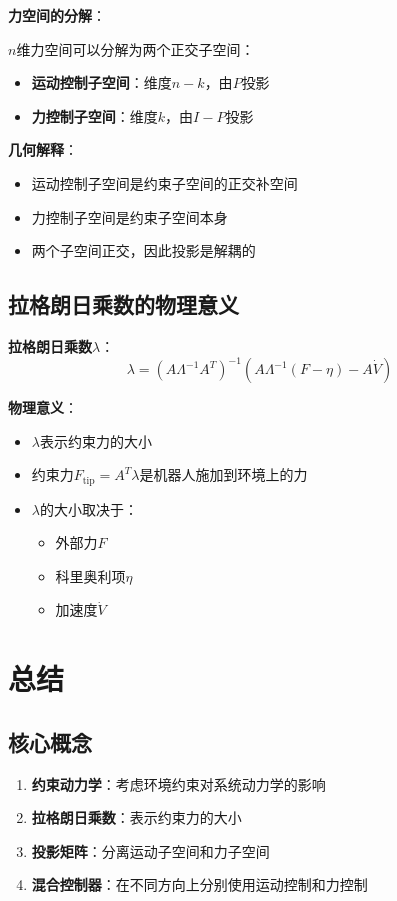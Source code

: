 \documentclass[12pt,a4paper]{article}
\begin{document}
\textbf{力空间的分解}：

$n$维力空间可以分解为两个正交子空间：
\begin{itemize}
\item \textbf{运动控制子空间}：维度$n-k$，由$P$投影
\item \textbf{力控制子空间}：维度$k$，由$I-P$投影
\end{itemize}

\textbf{几何解释}：
\begin{itemize}
\item 运动控制子空间是约束子空间的正交补空间
\item 力控制子空间是约束子空间本身
\item 两个子空间正交，因此投影是解耦的
\end{itemize}

\subsection{拉格朗日乘数的物理意义}

\textbf{拉格朗日乘数$\lambda$}：
\begin{equation}
\lambda = (A\Lambda^{-1}A^T)^{-1}(A\Lambda^{-1}(F - \eta) - A\dot{V})
\end{equation}

\textbf{物理意义}：
\begin{itemize}
\item $\lambda$表示约束力的大小
\item 约束力$F_{\text{tip}} = A^T\lambda$是机器人施加到环境上的力
\item $\lambda$的大小取决于：
\begin{itemize}
\item 外部力$F$
\item 科里奥利项$\eta$
\item 加速度$\dot{V}$
\end{itemize}
\end{itemize}

\section{总结}

\subsection{核心概念}

\begin{enumerate}
\item \textbf{约束动力学}：考虑环境约束对系统动力学的影响
\item \textbf{拉格朗日乘数}：表示约束力的大小
\item \textbf{投影矩阵}：分离运动子空间和力子空间
\item \textbf{混合控制器}：在不同方向上分别使用运动控制和力控制
\end{enumerate}
\end{document}
